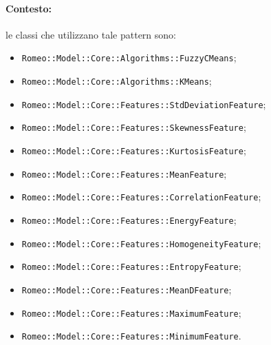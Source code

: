 \paragraph{Contesto:} le classi che utilizzano tale pattern sono:
\begin{itemize}
	\item \verb!Romeo::Model::Core::Algorithms::FuzzyCMeans!;
	\item \verb!Romeo::Model::Core::Algorithms::KMeans!;
	\item \verb!Romeo::Model::Core::Features::StdDeviationFeature!;
	\item \verb!Romeo::Model::Core::Features::SkewnessFeature!;
	\item \verb!Romeo::Model::Core::Features::KurtosisFeature!;
	\item \verb!Romeo::Model::Core::Features::MeanFeature!;
	\item \verb!Romeo::Model::Core::Features::CorrelationFeature!;
	\item \verb!Romeo::Model::Core::Features::EnergyFeature!;
	\item \verb!Romeo::Model::Core::Features::HomogeneityFeature!;
	\item \verb!Romeo::Model::Core::Features::EntropyFeature!;
	\item \verb!Romeo::Model::Core::Features::MeanDFeature!;
	\item \verb!Romeo::Model::Core::Features::MaximumFeature!;
	\item \verb!Romeo::Model::Core::Features::MinimumFeature!.
\end{itemize}